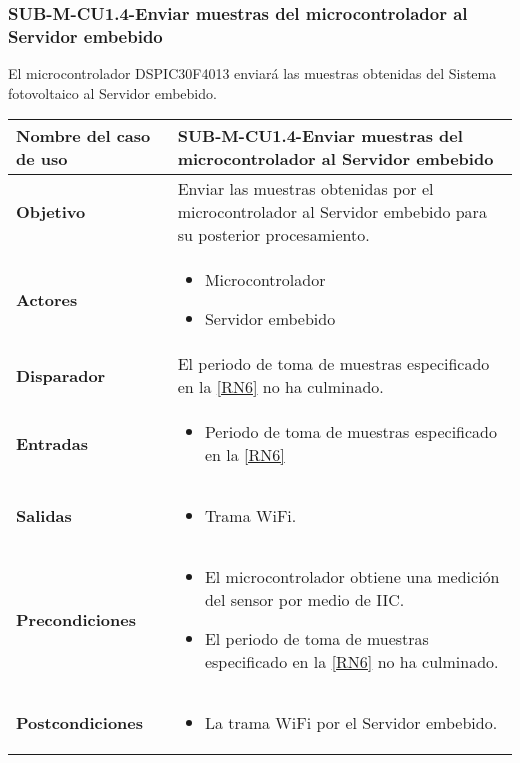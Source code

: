 \subsubsection{SUB-M-CU1.4-Enviar muestras del microcontrolador al Servidor embebido}\label{SUB-M-CU1.4}
El microcontrolador DSPIC30F4013 enviará las muestras obtenidas del Sistema fotovoltaico al Servidor embebido.
\begin{longtable}{|J{5cm}|J{10.3cm}|}
	\hline
	\textbf{Nombre del caso de uso} &
		SUB-M-CU1.4-Enviar muestras del microcontrolador al Servidor embebido \\ \hline
	\textbf{Objetivo} &
		Enviar las muestras obtenidas por el microcontrolador al Servidor embebido para su posterior procesamiento. \\ \hline
	\textbf{Actores} &
	    \begin{itemize}
		    \item Microcontrolador
		    \item Servidor embebido
		\end{itemize}\\ \hline 
	\textbf{Disparador} & 
		El periodo de toma de muestras especificado en la \ref{RN6} no ha culminado.\\ \hline 
	\textbf{Entradas} & 
		\begin{itemize}
				\item Periodo de toma de muestras especificado en la \ref{RN6}
		\end{itemize}\\ \hline 
	\textbf{Salidas} & 
	    \begin{itemize}
	        \item Trama WiFi.
	    \end{itemize}\\ \hline
	\textbf{Precondiciones} & 
		\begin{itemize}
		    \item El microcontrolador obtiene una medición del sensor por medio de IIC.
		    \item El periodo de toma de muestras especificado en la \ref{RN6} no ha culminado.
		\end{itemize}\\ \hline
	\textbf{Postcondiciones} &
		\begin{itemize}
			\item La trama WiFi por el Servidor embebido.

\end{itemize}
\end{longtable}
